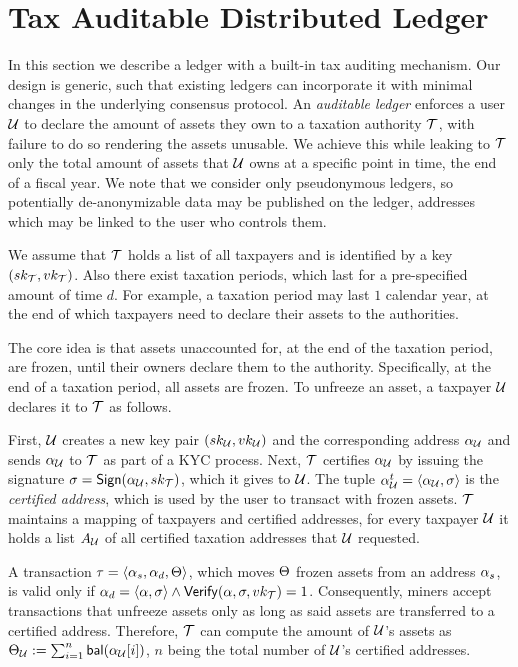 \section{Tax Auditable Distributed Ledger}\label{sec:taxchain}

In this section we describe a ledger with a built-in tax auditing mechanism.
Our design is generic, such that existing ledgers can incorporate it with
minimal changes in the underlying consensus protocol. An \emph{auditable
ledger} enforces a user $\mathcal{U}$ to declare the amount of assets they own to a
taxation authority $\mathcal{T}$, with failure to do so rendering the assets
unusable. We achieve this while leaking to $\mathcal{T}$ only the total amount of
assets that $\mathcal{U}$ owns at a specific point in time, \eg the end of a fiscal
year. We note that we consider only pseudonymous ledgers, so potentially
de-anonymizable data may be published on the ledger, \eg addresses which may be
linked to the user who controls them.

We assume that $\mathcal{T}$ holds a list of all taxpayers and is identified by a
key $(sk_{\mathcal{T}}, vk_{\mathcal{T}})$. Also there exist taxation
periods, which last for a pre-specified amount of time $d$. For example, a
taxation period may last $1$ calendar year, at the end of which taxpayers need
to declare their assets to the authorities.

The core idea is that assets unaccounted for, at the end of the taxation
period, are frozen, until their owners declare them to the authority.
Specifically, at the end of a taxation period, all assets are frozen. To
unfreeze an asset, a taxpayer $\mathcal{U}$ declares it to $\mathcal{T}$ as follows.

First, $\mathcal{U}$ creates a new key pair $(sk_{\mathcal{U}}, vk_{\mathcal{U}})$
and the corresponding address $\alpha_{\mathcal{U}}$ and sends $\alpha_{\mathcal{U}}$
to $\mathcal{T}$ as part of a KYC process.  Next, $\mathcal{T}$ certifies $\alpha_{\mathcal{U}}$ by issuing the
signature $\sigma = \mathsf{Sign}(\alpha_{\mathcal{U}}, sk_{\mathcal{T}})$, which it
gives to $\mathcal{U}$. The tuple $\alpha_{\mathcal{U}}^{t} = \langle \alpha_{\mathcal{U}},
\sigma \rangle$ is the \emph{certified address}, which is used by the user to
transact with frozen assets. $\mathcal{T}$ maintains a mapping of taxpayers and
certified addresses, \ie for every taxpayer $\mathcal{U}$ it holds a list $A_\mathcal{U}$
of all certified taxation addresses that $\mathcal{U}$ requested.

A transaction $\tau = \langle \alpha_{s}, \alpha_{d}, \Theta \rangle$,
which moves $\Theta$ frozen assets from an address $\alpha_{s}$, is valid
only if $\alpha_{d} = \langle \alpha, \sigma \rangle \land
\mathsf{Verify}(\alpha, \sigma, vk_{\mathcal{T}}) = 1$. Consequently, miners
accept transactions that unfreeze assets only as long as said assets are
transferred to a certified address. Therefore, $\mathcal{T}$ can compute the
amount of $\mathcal{U}$'s assets as $\Theta_\mathcal{U} := \sum_{i=1}^{n}
\mathsf{bal}(\alpha_{\mathcal{U}}[i])$, $n$ being the total number of $\mathcal{U}$'s
certified addresses.


